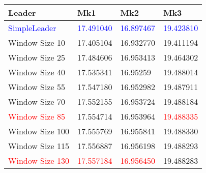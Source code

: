 \begin{tabularx}{\textwidth}{X X X X}
  \toprule
  \textbf{Leader} & \textbf{Mk1} & \textbf{Mk2} & \textbf{Mk3} \\
  \midrule
  \textcolor{blue}{SimpleLeader} & \textcolor{blue}{17.491040}
                                 & \textcolor{blue}{16.897467}
                                 & \textcolor{blue}{19.423810} \\
  \midrule
  Window Size 10 & 17.405104 & 16.932770 & 19.411194 \\
  \midrule
  Window Size 25 & 17.484606 & 16.953413 & 19.464302 \\
  \midrule
  Window Size 40 & 17.535341 & 16.95259 & 19.488014 \\
  \midrule
  Window Size 55 & 17.547180 & 16.952982 & 19.487911 \\
  \midrule
  Window Size 70 & 17.552155 & 16.953724 & 19.488184 \\
  \midrule
  \textcolor{red}{Window Size 85} & 17.554714 & 16.953964
                                  & \textcolor{red}{19.488335} \\
  \midrule
  Window Size 100 & 17.555769 & 16.955841 & 19.488330 \\
  \midrule
  Window Size 115 & 17.556887 & 16.956198 & 19.488293 \\
  \midrule
  \textcolor{red}{Window Size 130} & \textcolor{red}{17.557184}
                                   & \textcolor{red}{16.956450} & 19.488283 \\
  \bottomrule
\end{tabularx}
